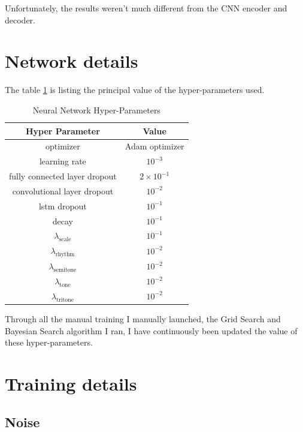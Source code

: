 \documentclass[12pt]{report}
\begin{document}
Unfortunately, the results weren't much different from the CNN encoder and decoder.

\section{Network details}

The table \ref{tab:network-hp} is listing the principal value of the hyper-parameters used.

\begin{table}[]
    \centering
    \begin{tabular}{c|c}
        Hyper Parameter & Value \\
        \hline
        optimizer &  Adam optimizer \cite{brownlee_gentle_2017, bushaev_adam_2018, kingma_adam_2017} \\
        learning rate & $10^{-3}$ \\
        fully connected layer dropout & $2 \times 10^{-1}$ \\
        convolutional layer dropout & $10^{-2}$ \\
        lstm dropout & $10^{-1}$ \\
        decay & $10^{-1}$ \\
        $\lambda_{\text{scale}}$ & $10^{-1}$ \\
        $\lambda_{\text{rhythm}}$ & $10^{-2}$ \\
        $\lambda_{\text{semitone}}$ & $10^{-2}$ \\
        $\lambda_{\text{tone}}$ & $10^{-2}$ \\
        $\lambda_{\text{tritone}}$ & $10^{-2}$ \\
    \end{tabular}
    \caption{Neural Network Hyper-Parameters}
    \label{tab:network-hp}
\end{table}

Through all the manual training I manually launched, the Grid Search and Bayesian Search algorithm I ran, I have continuously been updated the value of these hyper-parameters.


\section{Training details}

\subsection{Noise}
\end{document}
